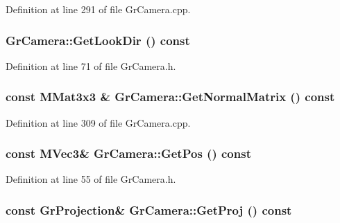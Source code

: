 Definition at line 291 of file GrCamera.cpp.\hypertarget{class_gr_camera_44d0c54e506b49a0e894700d6366741e}{
\subsubsection[{GetLookDir}]{ GrCamera::GetLookDir () const}}
\label{class_gr_camera_44d0c54e506b49a0e894700d6366741e}




Definition at line 71 of file GrCamera.h.\hypertarget{class_gr_camera_64e5f5d575f17151768cc1a2ce65ab85}{
\subsubsection[{GetNormalMatrix}]{\setlength{\rightskip}{0pt plus 5cm}const {\bf MMat3x3} \& GrCamera::GetNormalMatrix () const}}
\label{class_gr_camera_64e5f5d575f17151768cc1a2ce65ab85}




Definition at line 309 of file GrCamera.cpp.\hypertarget{class_gr_camera_8cda9065741c39d298fe54d5ef0c3705}{
\subsubsection[{GetPos}]{\setlength{\rightskip}{0pt plus 5cm}const {\bf MVec3}\& GrCamera::GetPos () const}}
\label{class_gr_camera_8cda9065741c39d298fe54d5ef0c3705}




Definition at line 55 of file GrCamera.h.\hypertarget{class_gr_camera_c4d5422b4554d779a1810e7beebc8e4e}{
\subsubsection[{GetProj}]{\setlength{\rightskip}{0pt plus 5cm}const {\bf GrProjection}\& GrCamera::GetProj () const}}
\label{class_gr_camera_c4d5422b4554d779a1810e7beebc8e4e}




